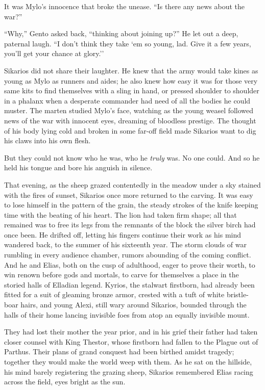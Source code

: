 It was Mylo's innocence that broke the unease. ``Is there any news about the war?''

``Why,'' Gento asked back, ``thinking about joining up?'' He let out a deep, paternal laugh. ``I don't think they take `em so young, lad. Give it a few years, you'll get your chance at glory.''

Sikarios did not share their laughter. He knew that the army would take kines as young as Mylo as runners and aides; he also knew how easy it was for those very same kits to find themselves with a sling in hand, or pressed shoulder to shoulder in a phalanx when a desperate commander had need of all the bodies he could muster. The marten studied Mylo's face, watching as the young weasel followed news of the war with innocent eyes, dreaming of bloodless prestige. The thought of his body lying cold and broken in some far-off field made Sikarios want to dig his claws into his own flesh.

But they could not know who he was, who he \emph{truly} was. No one could. And so he held his tongue and bore his anguish in silence.

\secdiv

That evening, as the sheep grazed contentedly in the meadow under a sky stained with the fires of sunset, Sikarios once more returned to the carving. It was easy to lose himself in the pattern of the grain, the steady strokes of the knife keeping time with the beating of his heart. The lion had taken firm shape; all that remained was to free its legs from the remnants of the block the silver birch had once been. He drifted off, letting his fingers continue their work as his mind wandered back, to the summer of his sixteenth year. The storm clouds of war rumbling in every audience chamber, rumors abounding of the coming conflict. And he and Elias, both on the cusp of adulthood, eager to prove their worth, to win renown before gods and mortals, to carve for themselves a place in the storied halls of Elladian legend. Kyrios, the stalwart firstborn, had already been fitted for a suit of gleaming bronze armor, crested with a tuft of white bristle-boar hairs, and young Alexi, still wary around Sikarios, bounded through the halls of their home lancing invisible foes from atop an equally invisible mount.

They had lost their mother the year prior, and in his grief their father had taken closer counsel with King Thestor, whose firstborn had fallen to the Plague out of Parthus. Their plans of grand conquest had been birthed amidst tragedy; together they would make the world weep with them. As he sat on the hillside, his mind barely registering the grazing sheep, Sikarios remembered Elias racing across the field, eyes bright as the sun.

